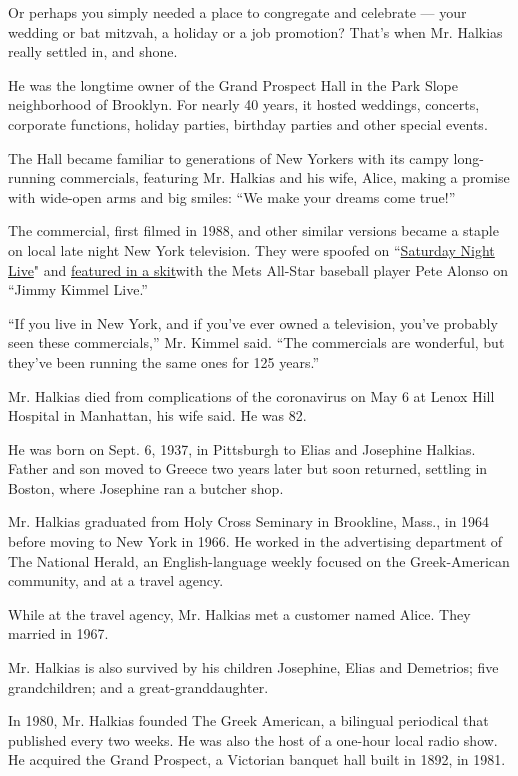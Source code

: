 Or perhaps you simply needed a place to congregate and celebrate ---
your wedding or bat mitzvah, a holiday or a job promotion? That's when
Mr. Halkias really settled in, and shone.

He was the longtime owner of the Grand Prospect Hall in the Park Slope
neighborhood of Brooklyn. For nearly 40 years, it hosted weddings,
concerts, corporate functions, holiday parties, birthday parties and
other special events.

The Hall became familiar to generations of New Yorkers with its campy
long-running commercials, featuring Mr. Halkias and his wife, Alice,
making a promise with wide-open arms and big smiles: ``We make your
dreams come true!''

The commercial, first filmed in 1988, and other similar versions became
a staple on local late night New York television. They were spoofed on
``\href{https://www.youtube.com/watch?v=L2_cOuO9rps\&feature=emb_rel_end}{Saturday
Night Live}" and
\href{https://www.youtube.com/watch?time_continue=3\&v=g7nKMqxvqRc\&feature=emb_title}{featured
in a skit}with the Mets All-Star baseball player Pete Alonso on ``Jimmy
Kimmel Live.''

``If you live in New York, and if you've ever owned a television, you've
probably seen these commercials,'' Mr. Kimmel said. ``The commercials
are wonderful, but they've been running the same ones for 125 years.''

Mr. Halkias died from complications of the coronavirus on May 6 at Lenox
Hill Hospital in Manhattan, his wife said. He was 82.

He was born on Sept. 6, 1937, in Pittsburgh to Elias and Josephine
Halkias. Father and son moved to Greece two years later but soon
returned, settling in Boston, where Josephine ran a butcher shop.

Mr. Halkias graduated from Holy Cross Seminary in Brookline, Mass., in
1964 before moving to New York in 1966. He worked in the advertising
department of The National Herald, an English-language weekly focused on
the Greek-American community, and at a travel agency.

While at the travel agency, Mr. Halkias met a customer named Alice. They
married in 1967.

Mr. Halkias is also survived by his children Josephine, Elias and
Demetrios; five grandchildren; and a great-granddaughter.

In 1980, Mr. Halkias founded The Greek American, a bilingual periodical
that published every two weeks. He was also the host of a one-hour local
radio show. He acquired the Grand Prospect, a Victorian banquet hall
built in 1892, in 1981.

